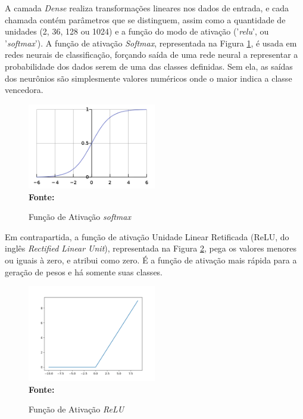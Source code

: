 A camada \textit{Dense} realiza transformações lineares nos dados de entrada, e cada chamada contém parâmetros que se distinguem, assim como a quantidade de unidades (2, 36, 128 ou 1024) e a função do modo de ativação ('\textit{relu}', ou '\textit{softmax}'). A função de ativação \textit{Softmax}, representada na Figura \ref{fig:softmax}, é usada em redes neurais de classificação, forçando saída de uma rede neural a representar a probabilidade dos dados serem de uma das classes definidas. Sem ela, as saídas dos neurônios são simplesmente valores numéricos onde o maior indica a classe vencedora.
\begin{figure}[ht]
 	\centering	
 	\caption[\hspace{0.1cm}Grade Computacional.]{Função de Ativação \textit{softmax}}
 	\vspace{-0.4cm}
 	\includegraphics[width=0.5\textwidth]{figuras/softmax.png}
 	\captionsetup{justification=centering}
	\vspace{-0.2cm}
     \\\textbf{\footnotesize Fonte: \cite{softmax}}
	\label{fig:softmax}
\end{figure}

Em contrapartida, a função de ativação Unidade Linear Retificada (ReLU, do inglês \textit{Rectified Linear Unit}), representada na Figura \ref{fig:relu}, pega os valores menores ou iguais à zero, e atribui como zero. É a função de ativação mais rápida para a geração de pesos e há somente suas classes.

\begin{figure}[ht]
 	\centering	
 	\caption[\hspace{0.1cm}Grade Computacional.]{Função de Ativação \textit{ReLU}}
 	\vspace{-0.4cm}
 	\includegraphics[width=0.5\textwidth]{figuras/relu.png}
 	\captionsetup{justification=centering}
	\vspace{-0.2cm}
     \\\textbf{\footnotesize Fonte: \cite{relu}}
	\label{fig:relu}
\end{figure}



